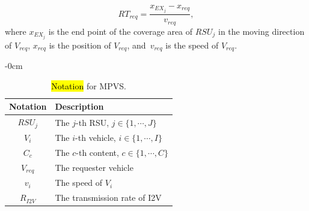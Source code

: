 \documentclass[sensors,aricle,accept,pdftex,moreauthors]{Definitions/mdpi}
\begin{document}
\begin{equation}
RT_{req}=\frac{x_{EX_j}-x_{req}}{v_{req}},
\end{equation}
where $x_{EX_j}$ is the end point of the coverage area of $RSU_{j}$ in the moving direction of $V_{req}$, $x_{req}$ is the position of $V_{req}$, and~$v_{req}$ is the speed of $V_{req}$.

\begin{table}[H]    
    \caption{{\hl{Notation} 
 for MPVS.}}
    \setlength{\tabcolsep}{8.7mm} 
    \begin{adjustwidth}{-\extralength}{0cm}%
\begin{tabular}{cl}
    \toprule
        \textbf{Notation} & \textbf{Description} \\
    \midrule
        $RSU_{j}$ & The $j$-th RSU, $j\in\{1,\cdots,J\}$ \\
        $V_{i}$ & The $i$-th vehicle, $i\in\{1,\cdots,I\}$ \\
        $C_{c}$ & The $c$-th content, $c\in\{1,\cdots,C\}$  \\
        $V_{req}$ & The requester vehicle \\
        $v_{i}$ & The speed of $V_{i}$ \\
        $R_{I2V}$ & The transmission rate of {I2V} \\    


\end{tabular}
\end{adjustwidth}
\end{table}
\end{document}
